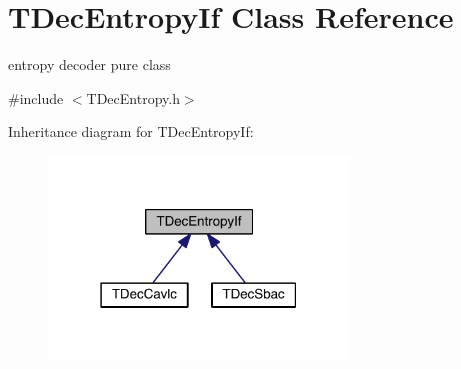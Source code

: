 \hypertarget{class_t_dec_entropy_if}{}\section{T\+Dec\+Entropy\+If Class Reference}
\label{class_t_dec_entropy_if}


entropy decoder pure class  




{\ttfamily \#include $<$T\+Dec\+Entropy.\+h$>$}



Inheritance diagram for T\+Dec\+Entropy\+If\+:
\nopagebreak
\begin{figure}[H]
\begin{center}
\leavevmode
\includegraphics[width=226pt]{d8/dbd/class_t_dec_entropy_if__inherit__graph}
\end{center}
\end{figure}
